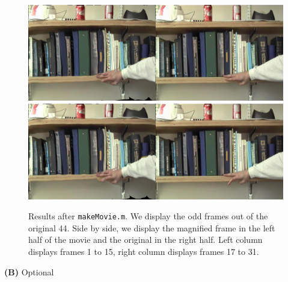 \documentclass[12pt,twoside]{article}
\begin{document}
\begin{figure}[h]
\begin{center}
    \includegraphics[width=0.45\linewidth, trim= 80pt 80pt 80pt 80pt, clip]{bookshelfMag/image15.jpg}
    \includegraphics[width=0.45\linewidth, trim= 80pt 80pt 80pt 80pt, clip]{bookshelfMag/image31.jpg} \\

  \end{center}
  \caption{Results after \texttt{makeMovie.m}.  We display the odd frames out of the original 44.  Side by side, we display the magnified frame in the left half of the movie and the original in the right half.  Left column displays frames 1 to 15, right column displays frames 17 to 31.}
  \label{fig:pipeline}
\end{figure}


\textbf{(B)} Optional

\end{document}
